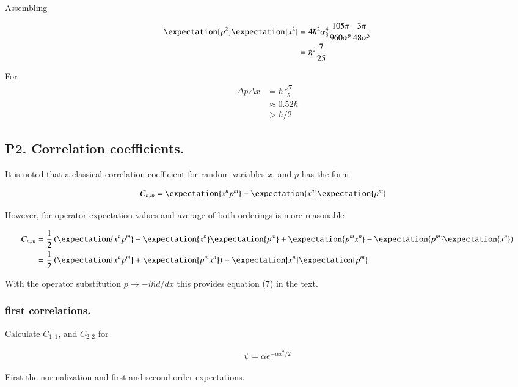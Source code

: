 \documentclass{article}
\begin{document}
Assembling

\begin{align*}
\expectation{p^2} \expectation{x^2} 
&= 4 \hbar^2 \alpha_3^4 \frac{105 \pi}{960 \alpha^9} \frac{3 \pi}{48 \alpha^5} \\
&= \hbar^2 \frac{7}{25}
\end{align*}

For
\begin{align*}
\Delta{p} \Delta{x} 
&= \hbar \frac{\sqrt{7}}{5} \\
&\approx 0.52 \hbar  \\
&> \hbar/2
\end{align*}

\subsection{P2. Correlation coefficients. }

It is noted that a classical correlation coefficient for random variables $x$, and $p$ has the form

\begin{align*}
C_{n,m}
&= \expectation{x^n p^m} - \expectation{x^n}\expectation{p^m}
\end{align*}

However, for operator expectation values and average of both orderings is more reasonable

\begin{align*}
C_{n,m}
&= \inv{2} \left( 
\expectation{x^n p^m} - \expectation{x^n}\expectation{p^m} 
+ \expectation{p^m x^n} - \expectation{p^m}\expectation{x^n} 
\right) \\
&= \inv{2} \left( \expectation{x^n p^m} + \expectation{p^m x^n} \right) - \expectation{x^n}\expectation{p^m} 
\end{align*}

With the operator substitution $p \rightarrow -i \hbar d/dx$ this provides equation (7) in the text.

\subsubsection{first correlations. }

Calculate $C_{1,1}$, and $C_{2,2}$ for 

\begin{align*}
\psi = \alpha e^{-\alpha x^2/2}
\end{align*}

First the normalization and first and second order expectations.
\end{document}
